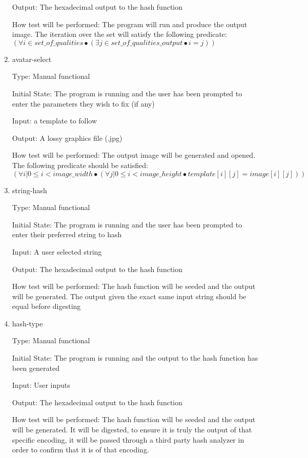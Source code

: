 \documentclass[12pt, titlepage]{article}
\begin{document}
\begin{enumerate}
Output: The hexadecimal output to the hash function

How test will be performed: The program will run and produce the output image. The iteration over the set will satisfy the following predicate: $(\forall i \in set\_of\_qualities \bullet (\exists j \in set\_of\_qualities\_output \bullet i = j)) $

\item{avatar-select}

Type: Manual functional

Initial State: The program is running and the user has been prompted to enter the parameters they wish to fix (if any)

Input: a template to follow

Output: A lossy graphics file (.jpg)

How test will be performed: The output image will be generated and opened. The following predicate should be satisfied: \\ $(\forall i | 0 \leq i < image\_width \bullet (\forall j | 0 \leq i < image\_height \bullet template[i][j] = image[i][j])) $

\item{string-hash}

Type: Manual functional

Initial State: The program is running and the user has been prompted to enter their preferred string to hash

Input: A user selected string

Output: The hexadecimal output to the hash function

How test will be performed: The hash function will be seeded and the output will be generated. The output given the exact same input string should be equal before digesting

\item{hash-type}

Type: Manual functional

Initial State: The program is running and the output to the hash function has been generated

Input: User inputs

Output: The hexadecimal output to the hash function

How test will be performed: The hash function will be seeded and the output will be generated. It will be digested, to ensure it is truly the output of that specific encoding, it will be passed through a third party hash analyzer in order to confirm that it is of that encoding.


\end{enumerate}
\end{document}
